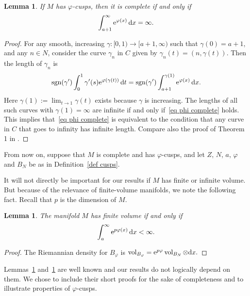 \documentclass[pdftex]{sigma}%
\numberwithin{equation}{section}
\newtheorem{Lemma}[Theorem]{Lemma}
\DeclareMathOperator{\sgn}{sgn}
\DeclareMathOperator{\vol}{vol}
\begin{document}
\begin{Lemma}\label{lem phi complete}
If $M$ has $\varphi$-cusps, then it is complete if and only if
\begin{equation} \label{eq phi complete}
\int_{a+1}^{\infty} {\rm e}^{\varphi(x)}\, {\rm d}x = \infty.
\end{equation}
\end{Lemma}
\begin{proof}
For any smooth, increasing $\gamma\colon [0,1) \to [a+1,\infty)$ such that $\gamma(0) = a+1$, and any $n \in N$, consider the curve $\gamma_{n}$ in $C$ given by $\gamma_{n}(t) = (n, \gamma(t))$. Then the length of $\gamma_{n}$ is
\[
\sgn(\gamma') \int_0^1 \gamma'(s) {\rm e}^{\varphi(\gamma(t))}\, {\rm d}t = \sgn(\gamma') \int_{a+1}^{\gamma(1)} {\rm e}^{\varphi(x)}\, {\rm d}x.
\]
Here $\gamma(1):= \lim_{ t\to 1}\gamma(t)$ exists because $\gamma$ is increasing. The lengths of all such curves with $\gamma(1)= \infty$ are infinite if and only if~\eqref{eq phi complete} holds. This implies that~\eqref{eq phi complete} is equivalent to the condition that any curve in $C$ that goes to infinity has infinite length.
Compare also the proof of Theorem 1 in \cite{Nomizu61}.
\end{proof}

From now on, suppose that $M$ is complete and has {$\varphi$-cusps}, and let $Z$, $N$, $a$, $\varphi$ and $B_N$ be as in Definition~\ref{def cusps}.

It will not directly be important for our results if $M$ has finite or infinite volume. But because of the relevance of finite-volume manifolds, we note the following fact. Recall that $p$ is the dimension of $M$.
\begin{Lemma}\label{lem fin vol}
The manifold $M$ has finite volume if and only if
\[
\int_a^{\infty} {\rm e}^{p\varphi(x)}\, {\rm d}x < \infty.
\]
\end{Lemma}
\begin{proof}
The Riemannian density for $B_{\varphi}$ is
$
\vol_{B_{\varphi}} = {\rm e}^{p \varphi} \vol_{B_N} \otimes {\rm d}x.
$
\end{proof}

Lemmas~\ref{lem phi complete} and~\ref{lem fin vol} are well known and our results do not logically depend on them. We chose to include their short proofs for the sake of completeness and to illustrate properties of $\varphi$-cusps.
\end{document}
